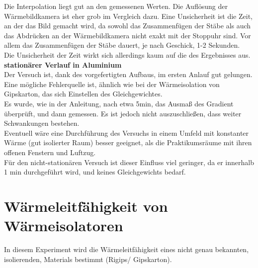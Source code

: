 \documentclass[12pt,a4paper]{article}
\begin{document}
\begin{multicols}{2}
Die Interpolation liegt gut an den gemessenen Werten. Die Auflösung der Wärmebildkamera ist eher grob im Vergleich dazu.
Eine Unsicherheit ist die Zeit, an der das Bild gemacht wird, da sowohl das Zusammenfügen der Stäbe als auch das Abdrücken an der Wärmebildkamera nicht exakt mit der Stoppuhr sind.
Vor allem das Zusammenfügen der Stäbe dauert, je nach Geschick, 1-2 Sekunden.\\
Die Unsicherheit der Zeit wirkt sich allerdings kaum auf die des Ergebnisses aus.\\

\noindent \textbf{stationärer Verlauf in Aluminium}\\
Der Versuch ist, dank des vorgefertigten Aufbaus, im ersten Anlauf gut gelungen.\\
Eine mögliche Fehlerquelle ist, ähnlich wie bei der Wärmeisolation von Gipskarton, das sich Einstellen des Gleichgewichtes.\\
Es wurde, wie in der Anleitung, nach etwa 5min, das Ausmaß des Gradient überprüft, und dann gemessen. Es ist jedoch nicht auszuschließen, dass weiter Schwankungen bestehen.\\
Eventuell wäre eine Durchführung des Versuchs in einem Umfeld mit konstanter Wärme (gut isolierter Raum) besser geeignet, als die Praktikumsräume mit ihren offenen Fenstern und Luftzug.\\
Für den nicht-stationären Versuch ist dieser Einfluss viel geringer, da er innerhalb 1 min durchgeführt wird, und keines Gleichgewichts bedarf.



\section{Wärmeleitfähigkeit von Wärmeisolatoren}
In diesem Experiment wird die Wärmeleitfähigkeit eines nicht genau bekannten, isolierenden, Materials bestimmt (Rigips/ Gipskarton).


\end{multicols}
\end{document}

